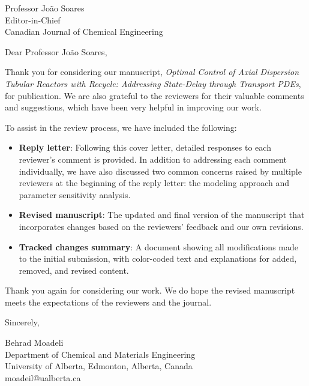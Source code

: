 \documentclass[12pt]{letter}
\begin{document}
\date{November 20, 2024}

\begin{letter}{Professor João Soares \\
Editor-in-Chief \\
Canadian Journal of Chemical Engineering}

\opening{Dear Professor João Soares,}

Thank you for considering our manuscript, \textit{Optimal Control of Axial Dispersion Tubular Reactors with Recycle: Addressing State-Delay through Transport PDEs}, for publication. We are also grateful to the reviewers for their valuable comments and suggestions, which have been very helpful in improving our work.

To assist in the review process, we have included the following:
\begin{itemize}
    \item \textbf{Reply letter}: Following this cover letter, detailed responses to each reviewer’s comment is provided. In addition to addressing each comment individually, we have also discussed two common concerns raised by multiple reviewers at the beginning of the reply letter: the modeling approach and parameter sensitivity analysis.
    \item \textbf{Revised manuscript}: The updated and final version of the manuscript that incorporates changes based on the reviewers' feedback and our own revisions.
    \item \textbf{Tracked changes summary}: A document showing all modifications made to the initial submission, with color-coded text and explanations for added, removed, and revised content.
\end{itemize}

Thank you again for considering our work. We do hope the revised manuscript meets the expectations of the reviewers and the journal.

\closing{Sincerely,}

\vspace{-4em} %

Behrad Moadeli \\
Department of Chemical and Materials Engineering \\
University of Alberta, Edmonton, Alberta, Canada \\
moadeil@ualberta.ca

\end{letter}
\end{document}
